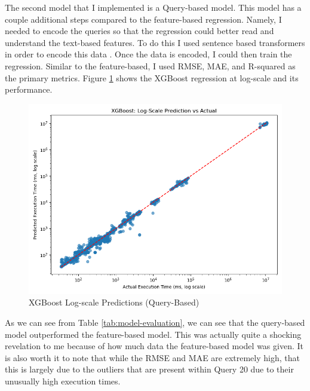 \documentclass[sigconf]{acmart}
\begin{document}
The second model that I implemented is a Query-based model. This model has a couple additional steps compared to the feature-based regression. Namely, I needed to encode the queries so that the regression could better
read and understand the text-based features. To do this I used sentence based transformers in order to encode this data \cite{reimers2019sentencebertsentenceembeddingsusing}. Once the data is encoded, I could then train the
regression. Similar to the feature-based, I used RMSE, MAE, and R-squared as the primary metrics. Figure \ref{fig:xgb-query-log} shows the XGBoost regression at log-scale and its performance.

\begin{figure}[h!]
  \centering
  \includegraphics[width=\linewidth]{query_based_xgb/logscale.png}
  \caption{XGBoost Log-scale Predictions (Query-Based)}
  \label{fig:xgb-query-log}
\end{figure}

As we can see from Table \ref{tab:model-evaluation}, we can see that the query-based model outperformed the feature-based model.
This was actually quite a shocking revelation to me because of how much data the feature-based model was given. It is also worth it to note that while the RMSE and MAE are extremely high, that this is largely due to the outliers
that are present within Query 20 due to their unusually high execution times.
\end{document}
